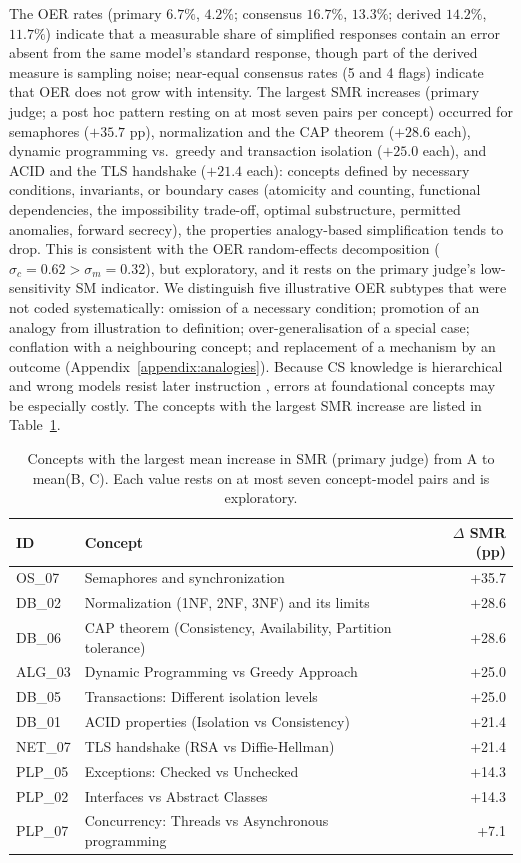 \documentclass[journal,article,submit,pdftex,moreauthors]{Definitions/mdpi}
\begin{document}
The OER rates (primary $6.7\%$, $4.2\%$; consensus $16.7\%$, $13.3\%$; derived $14.2\%$, $11.7\%$) indicate that a measurable share of simplified responses contain an error absent from the same model's standard response, though part of the derived measure is sampling noise; near-equal consensus rates (5 and 4 flags) indicate that OER does not grow with intensity. The largest SMR increases (primary judge; a post hoc pattern resting on at most seven pairs per concept) occurred for semaphores ($+35.7$ pp), normalization and the CAP theorem ($+28.6$ each), dynamic programming vs.\ greedy and transaction isolation ($+25.0$ each), and ACID and the TLS handshake ($+21.4$ each): concepts defined by necessary conditions, invariants, or boundary cases (atomicity and counting, functional dependencies, the impossibility trade-off, optimal substructure, permitted anomalies, forward secrecy), the properties analogy-based simplification tends to drop. This is consistent with the OER random-effects decomposition ($\sigma_c = 0.62 > \sigma_m = 0.32$), but exploratory, and it rests on the primary judge's low-sensitivity SM indicator. We distinguish five illustrative OER subtypes that were not coded systematically: omission of a necessary condition; promotion of an analogy from illustration to definition; over-generalisation of a special case; conflation with a neighbouring concept; and replacement of a mechanism by an outcome (Appendix~\ref{appendix:analogies}). Because CS knowledge is hierarchical \cite{benari2001constructivism} and wrong models resist later instruction \cite{chi1994things, posner1982accommodation}, errors at foundational concepts may be especially costly. The concepts with the largest SMR increase are listed in Table~\ref{tab:concepts:top10}.
\begin{table}[H]
\caption{Concepts with the largest mean increase in SMR (primary judge) from A to mean(B, C). Each value rests on at most seven concept-model pairs and is exploratory.}
\label{tab:concepts:top10}
\centering
\small
\begin{tabular}{llr}
\toprule
ID & Concept & $\Delta$ SMR (pp) \\
\midrule
OS\_07 & Semaphores and synchronization & +35.7 \\
DB\_02 & Normalization (1NF, 2NF, 3NF) and its limits & +28.6 \\
DB\_06 & CAP theorem (Consistency, Availability, Partition tolerance) & +28.6 \\
ALG\_03 & Dynamic Programming vs Greedy Approach & +25.0 \\
DB\_05 & Transactions: Different isolation levels & +25.0 \\
DB\_01 & ACID properties (Isolation vs Consistency) & +21.4 \\
NET\_07 & TLS handshake (RSA vs Diffie-Hellman) & +21.4 \\
PLP\_05 & Exceptions: Checked vs Unchecked & +14.3 \\
PLP\_02 & Interfaces vs Abstract Classes & +14.3 \\
PLP\_07 & Concurrency: Threads vs Asynchronous programming & +7.1 \\
\bottomrule
\end{tabular}
\end{table}
\end{document}
